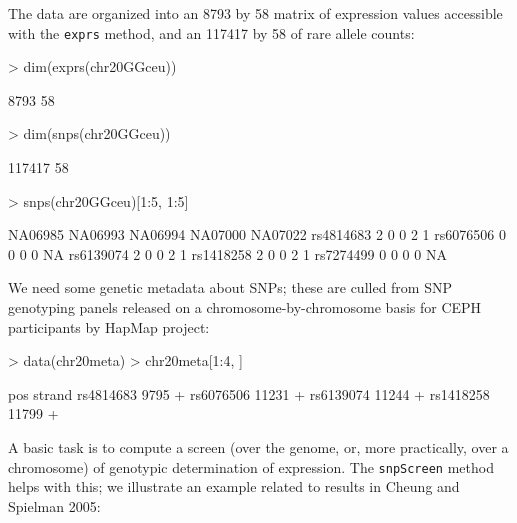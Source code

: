 \documentclass[12pt]{article}
\newcommand{\Rfunction}[1]{{\texttt{#1}}}
\begin{document}
The data are organized into an 8793
by 58 matrix of expression values
accessible with the \texttt{exprs} method, and
an 117417 by 58
of rare allele counts:
\begin{Schunk}
\begin{Sinput}
> dim(exprs(chr20GGceu))
\end{Sinput}
\begin{Soutput}
[1] 8793   58
\end{Soutput}
\begin{Sinput}
> dim(snps(chr20GGceu))
\end{Sinput}
\begin{Soutput}
[1] 117417     58
\end{Soutput}
\begin{Sinput}
> snps(chr20GGceu)[1:5, 1:5]
\end{Sinput}
\begin{Soutput}
          NA06985 NA06993 NA06994 NA07000 NA07022
rs4814683       2       0       0       2       1
rs6076506       0       0       0       0      NA
rs6139074       2       0       0       2       1
rs1418258       2       0       0       2       1
rs7274499       0       0       0       0      NA
\end{Soutput}
\end{Schunk}

We need some genetic metadata about SNPs; these are
culled from SNP genotyping panels released on a 
chromosome-by-chromosome basis for CEPH participants
by HapMap project:
\begin{Schunk}
\begin{Sinput}
> data(chr20meta)
> chr20meta[1:4, ]
\end{Sinput}
\begin{Soutput}
            pos strand
rs4814683  9795      +
rs6076506 11231      +
rs6139074 11244      +
rs1418258 11799      +
\end{Soutput}
\end{Schunk}

A basic task is to compute a screen (over the genome, or,
more practically, over a chromosome) of genotypic determination
of expression.  The \Rfunction{snpScreen} method helps
with this; we illustrate an example related to
results in Cheung and Spielman 2005:
\end{document}
